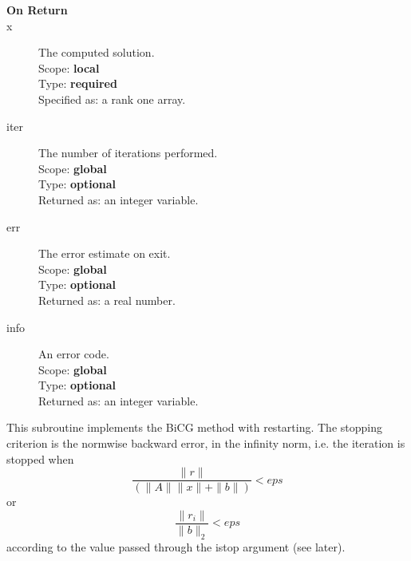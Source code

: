 \begin{description}
\item[\bf On Return] 
\item[x] The computed solution. \\
Scope: {\bf local} \\
Type: {\bf required}\\
Specified as: a rank one array.
\item[iter]  The number of iterations performed.\\
Scope: {\bf global} \\
Type: {\bf optional}\\
Returned  as: an integer variable.
\item[err]  The error estimate on exit.\\
Scope: {\bf global} \\
Type: {\bf optional}\\
Returned  as: a real number.
\item[info]  An error code.\\
Scope: {\bf global} \\
Type: {\bf optional}\\
Returned  as: an integer variable.
\end{description}

%
%

This subroutine implements the BiCG method with restarting. The
stopping criterion is the normwise backward error, in the infinity
norm, i.e. the iteration is stopped when 
\[ \frac{\|r\|}{(\|A\|\|x\|+\|b\|)} < eps \]
or
\[ \frac{\|r_i\|}{\|b\|_2} < eps \]
according to the value passed through the  istop argument (see later).



